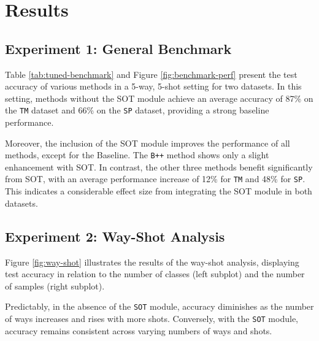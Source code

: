\section{Results}


\subsection{Experiment 1: General Benchmark}

Table \ref{tab:tuned-benchmark} and Figure \ref{fig:benchmark-perf} present the test accuracy of various methods in a 5-way, 5-shot setting for two datasets. In this setting, methods without the SOT module achieve an average accuracy of 87\% on the \texttt{TM} dataset and 66\% on the \texttt{SP} dataset, providing a strong baseline performance.

Moreover, the inclusion of the SOT module improves the performance of all methods, except for the Baseline. The \texttt{B++} method shows only a slight enhancement with SOT. In contrast, the other three methods benefit significantly from SOT, with an average performance increase of 12\% for \texttt{TM} and 48\% for \texttt{SP}. This indicates a considerable effect size from integrating the SOT module in both datasets.



\subsection{Experiment 2: Way-Shot Analysis}

Figure \ref{fig:way-shot} illustrates the results of the way-shot analysis, displaying test accuracy in relation to the number of classes (left subplot) and the number of samples (right subplot).

Predictably, in the absence of the \texttt{SOT} module, accuracy diminishes as the number of ways increases and rises with more shots. Conversely, with the \texttt{SOT} module, accuracy remains consistent across varying numbers of ways and shots.

